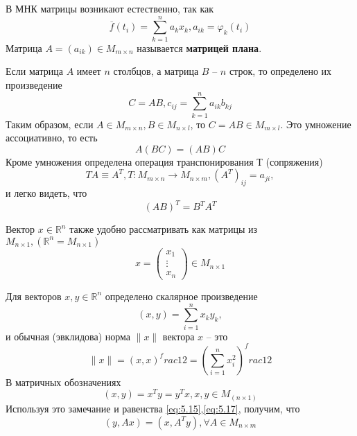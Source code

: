 В МНК матрицы возникают естественно, так как
 \begin{equation}
	\overline{f} (t_i) = \sum_{k=1}^n {a_k x_k}, a_{ik} = \varphi_k(t_i) 
\end{equation}
Матрица $A = (a_{ik}) \in M_{m \times n}$ называется \textbf{матрицей плана}.

Если матрица $A$ имеет $n$ столбцов, а матрица $B$ -- $n$ строк, то определено их произведение
\begin{equation}
	C = AB, c_{ij} = \sum_{k=1}^n{a_{ik}b_{kj}}
\end{equation}
Таким образом, если $A \in M_{m \times n}, B \in M_{n \times l}$, то $C = AB \in M_{m \times l}$. Это умножение ассоциативно, то есть
\begin{equation}\label{eq:5.15}
	A (BC) = (AB) C
\end{equation}
Кроме умножения определена операция транспонирования Т (сопряжения)
\begin{equation}
	TA \equiv A^T, T: M_{m\times n} \rightarrow M_{n\times m}, (A^T)_{ij} = a_{ji},
\end{equation}
и легко видеть, что
\begin{equation}\label{eq:5.17}
	(AB) ^ T = B^T A^T
\end{equation}

Вектор $x \in \mathbb{R}^n$ также удобно рассматривать как матрицы из $M_{n \times 1}, (\mathbb{R}^n = M_{n \times 1})$
\begin{equation}
	x = \begin{pmatrix}
		x_1\\
		\vdots\\
		x_n
	\end{pmatrix}
	\in M_{n\times 1}
\end{equation}

Для векторов $x, y \in \mathbb{R}^n$ определено скалярное произведение
\begin{equation}
	(x, y) = \sum_{i=1}^n x_k y_k, 
\end{equation}
и обычная (эвклидова) норма $\|x\|$ вектора $x$  -- это
\begin{equation} 
	\|x \| = (x, x)^frac{1}{2} = (\sum_{i=1}^n x_i^2)^frac{1}{2}
\end{equation}
В матричных обозначениях
\begin{equation}
	(x, y) = x^T y = y^T x, x,y \in M_(n \times 1 )
\end{equation}
Используя это замечание и равенства \ref{eq:5.15},\ref{eq:5.17}, получим, что
\begin{equation}\label{eq:5.22}
	(y, Ax) = (x, A^T y), \forall A \in M_{n\times m}
\end{equation}
	

